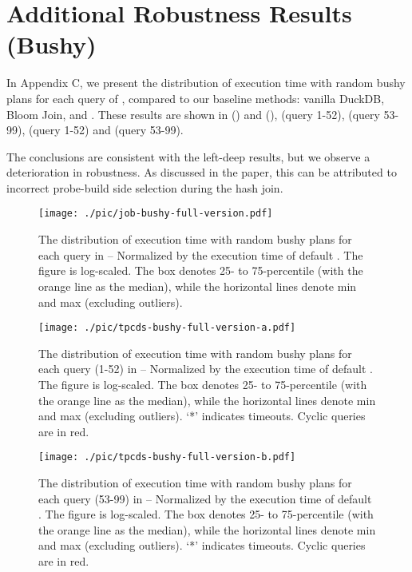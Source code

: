 \section{Additional Robustness Results (Bushy)}

In Appendix C, we present the distribution of execution time with random bushy plans for each query of \RPT, compared to our baseline methods: vanilla DuckDB, Bloom Join, and \PT. These results are shown in  (\tpch) and  (\job),  (\tpcds query 1-52),  (\tpcds query 53-99),  (\dsb query 1-52) and  (\dsb query 53-99).

The conclusions are consistent with the left-deep results, but we observe a deterioration in robustness. As discussed in the paper, this can be attributed to incorrect probe-build side selection during the hash join.

\begin{figure*}[t!]
    \centering
    \texttt{[image: ./pic/job-bushy-full-version.pdf]}
    \caption{The distribution of execution time with random bushy plans for each query in \job \textnormal{-- Normalized by the execution time of default \duckdb. The figure is log-scaled. The box denotes 25- to 75-percentile (with the orange line as the median), while the horizontal lines denote min and max (excluding outliers).}}
    \label{fig:job-bushy}
\end{figure*}

\begin{figure*}[t!]
    \centering
    \texttt{[image: ./pic/tpcds-bushy-full-version-a.pdf]}
    \caption{The distribution of execution time with random bushy plans for each query (1-52) in \tpcds \textnormal{-- Normalized by the execution time of default \duckdb. The figure is log-scaled. The box denotes 25- to 75-percentile (with the orange line as the median), while the horizontal lines denote min and max (excluding outliers). `*' indicates timeouts. Cyclic queries are in red.}}
    \label{fig:tpcds-bushy-a}
\end{figure*}

\begin{figure*}[t!]
    \centering
    \texttt{[image: ./pic/tpcds-bushy-full-version-b.pdf]}
    \caption{The distribution of execution time with random bushy plans for each query (53-99) in \tpcds \textnormal{-- Normalized by the execution time of default \duckdb. The figure is log-scaled. The box denotes 25- to 75-percentile (with the orange line as the median), while the horizontal lines denote min and max (excluding outliers). `*' indicates timeouts. Cyclic queries are in red.}}
    \label{fig:tpcds-bushy-b}
\end{figure*}

